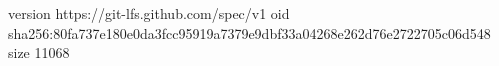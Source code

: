 version https://git-lfs.github.com/spec/v1
oid sha256:80fa737e180e0da3fcc95919a7379e9dbf33a04268e262d76e2722705c06d548
size 11068
